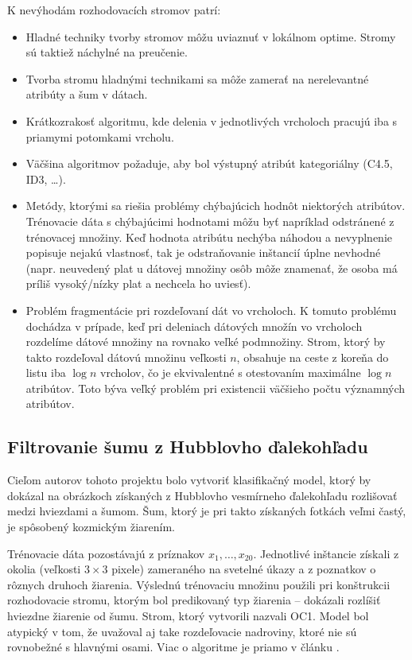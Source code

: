 K nevýhodám rozhodovacích stromov patrí:
\begin{itemize}
\item Hladné techniky tvorby stromov môžu uviaznuť v lokálnom optime. Stromy sú taktiež náchylné na preučenie.
\item Tvorba stromu hladnými technikami sa môže zamerať na nerelevantné atribúty a šum v dátach.
\item Krátkozrakosť algoritmu, kde delenia v jednotlivých vrcholoch pracujú iba s priamymi potomkami vrcholu.
\item Väčšina algoritmov požaduje, aby bol výstupný atribút kategoriálny (C4.5, ID3, \ldots).
\item Metódy, ktorými sa riešia problémy chýbajúcich hodnôt niektorých atribútov. Trénovacie dáta s chýbajúcimi hodnotami môžu byť napríklad odstránené z trénovacej množiny. Keď hodnota atribútu nechýba náhodou a nevyplnenie popisuje nejakú vlastnosť, tak je odstraňovanie inštancií úplne nevhodné (napr. neuvedený plat u dátovej množiny osôb môže znamenať, že osoba má príliš vysoký/nízky plat a nechcela ho uviesť).
\item Problém fragmentácie pri rozdeľovaní dát vo vrcholoch. K tomuto problému dochádza v prípade, keď pri deleniach dátových množín vo vrcholoch rozdelíme dátové množiny na rovnako veľké podmnožiny. Strom, ktorý by takto rozdeľoval dátovú množinu veľkosti $n$, obsahuje na ceste z koreňa do listu iba $\log n$ vrcholov, čo je ekvivalentné s otestovaním maximálne $\log n$ atribútov. Toto býva veľký problém pri existencii väčšieho počtu významných atribútov.
\end{itemize}

\subsection{Filtrovanie šumu z Hubblovho ďalekohľadu}\label{kap1:2.8:2.8.2:Hubble}
Cieľom autorov tohoto projektu \cite{online-astronomy} bolo vytvoriť klasifikačný model, ktorý by dokázal na obrázkoch získaných z Hubblovho vesmírneho ďalekohľadu rozlišovať medzi hviezdami a šumom. Šum, ktorý je pri takto získaných fotkách veľmi častý, je spôsobený kozmickým žiarením. 

Trénovacie dáta pozostávajú z príznakov $x_{1},\ldots,x_{20}$. Jednotlivé inštancie získali z okolia (veľkosti $3 \times 3$ pixele) zameraného na svetelné úkazy a z poznatkov o rôznych druhoch žiarenia. Výslednú trénovaciu množinu použili pri konštrukcii rozhodovacie stromu, ktorým bol predikovaný typ žiarenia -- dokázali rozlíšiť hviezdne žiarenie od šumu. Strom, ktorý vytvorili nazvali OC1. Model bol atypický v tom, že uvažoval aj take rozdeľovacie nadroviny, ktoré nie sú rovnobežné s hlavnými osami. Viac o algoritme je priamo v článku \cite[str. 281]{online-astronomy}.

